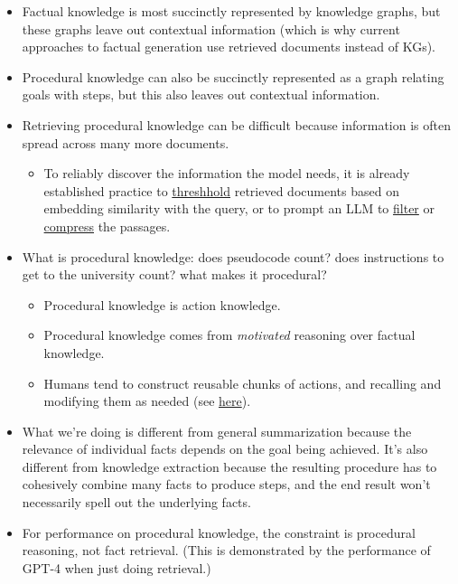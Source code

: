 \documentclass{article}
\begin{document}
\begin{itemize}
   \item Factual knowledge is most succinctly represented by knowledge graphs, but these graphs leave out contextual information (which is why current approaches to factual generation use retrieved documents instead of KGs).
   \item Procedural knowledge can also be succinctly represented as a graph relating goals with steps, but this also leaves out contextual information.
   \item Retrieving procedural knowledge can be difficult because information is often spread across many more documents.
         \begin{itemize}
            \item To reliably discover the information the model needs, it is already established practice to \href{https://python.langchain.com/docs/modules/data\_connection/retrievers/contextual\_compression/\#embeddingsfilter}{threshhold} retrieved documents based on embedding similarity with the query, or to prompt an LLM to \href{https://python.langchain.com/docs/modules/data\_connection/retrievers/contextual\_compression/\#llmchainfilter}{filter} or \href{https://python.langchain.com/docs/modules/data\_connection/retrievers/contextual\_compression/\#adding-contextual-compression-with-an-llmchainextractor}{compress} the passages.
         \end{itemize}
   \item What is procedural knowledge: does pseudocode count? does instructions to get to the university count? what makes it procedural?
         \begin{itemize}
            \item Procedural knowledge is action knowledge.
            \item Procedural knowledge comes from \textit{motivated} reasoning over factual knowledge.
            \item Humans tend to construct reusable chunks of actions, and recalling and modifying them as needed (see \href{https://en.wikipedia.org/wiki/Procedural_knowledge#Activation}{here}).
         \end{itemize}
   \item What we're doing is different from general summarization because the relevance of individual facts depends on the goal being achieved. It's also different from knowledge extraction because the resulting procedure has to cohesively combine many facts to produce steps, and the end result won't necessarily spell out the underlying facts.
   \item For performance on procedural knowledge, the constraint is procedural reasoning, not fact retrieval. (This is demonstrated by the performance of GPT-4 when just doing retrieval.)
\end{itemize}
\end{document}
